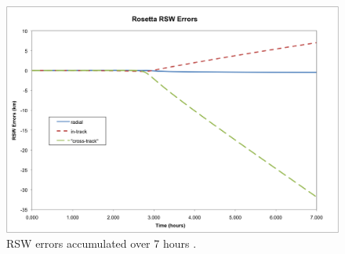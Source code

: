 \begin{description}
\begin{figure}
\begin{center}
\includegraphics [width=7.0in]{figs/rosetta/rosettaerr.png}
\end{center}
\caption{RSW errors accumulated over 7 hours  .}
\label{fig:9}
\end{figure}

\end{description}
\clearpage
\newpage


